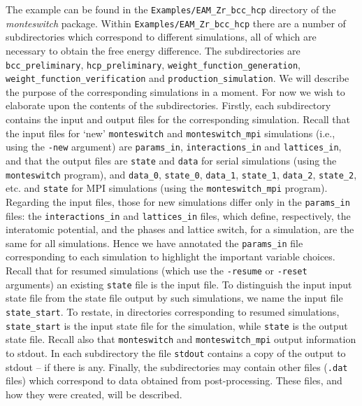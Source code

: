 \documentclass{report}
\begin{document}
The example can be found in the \texttt{Examples/EAM\_Zr\_bcc\_hcp} directory of the \emph{monteswitch} package. Within 
\texttt{Examples/EAM\_Zr\_bcc\_hcp} there are a number of subdirectories which correspond to different simulations, all of which are 
necessary to obtain the free energy difference. The subdirectories are \texttt{bcc\_preliminary}, \texttt{hcp\_preliminary},
\texttt{weight\_function\_generation}, \texttt{weight\_function\_verification} and \texttt{production\_simulation}. We will describe the
purpose of the corresponding simulations in a moment. For now we wish to elaborate upon the contents of the subdirectories. Firstly, each 
subdirectory contains the input and output files for the corresponding simulation. Recall that the input files for `new' 
\texttt{monteswitch} and \texttt{monteswitch\_mpi} simulations (i.e., using the \texttt{-new} argument)
are \texttt{params\_in}, \texttt{interactions\_in} and \texttt{lattices\_in}, and that the output files are \texttt{state} and \texttt{data} 
for serial simulations (using the \texttt{monteswitch} program), and \texttt{data\_0}, \texttt{state\_0}, \texttt{data\_1}, \texttt{state\_1},
\texttt{data\_2}, \texttt{state\_2}, etc. and \texttt{state} for MPI simulations (using the \texttt{monteswitch\_mpi} program). Regarding the input
files, those for new simulations differ only in the \texttt{params\_in} files: the \texttt{interactions\_in} and \texttt{lattices\_in} files,
which define, respectively, the interatomic potential, and the phases and lattice switch, for a simulation, 
are the same for all simulations. Hence we have annotated the \texttt{params\_in} file corresponding to each simulation
to highlight the important variable choices. Recall that for resumed simulations (which use the \texttt{-resume} or \texttt{-reset} arguments)
an existing \texttt{state} file is the input file. To distinguish the input input state file from the state file output
by such simulations, we name the input file \texttt{state\_start}. To restate, in directories corresponding to resumed simulations,
\texttt{state\_start} is the input state file for the simulation, while \texttt{state} is the output state file.
Recall also that \texttt{monteswitch} and \texttt{monteswitch\_mpi} output information to stdout. 
In each subdirectory the file \texttt{stdout} contains a copy of the output to stdout -- if there is any. Finally, the 
subdirectories may contain other files (\texttt{.dat} files) which correspond to data obtained from post-processing. These files,
and how they were created, will be described.
\end{document}
